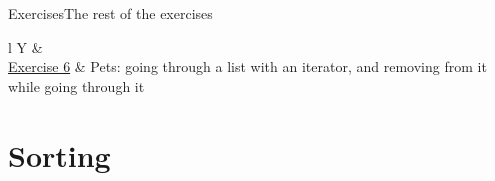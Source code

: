 \documentclass[\deckoptions]{beamer}
\begin{document}
\begin{frame}{Exercises}{The rest of the exercises}
  \begin{datatable}{l Y}
     &  \\
    \grouprule
    \href{https://github.com/alfaro96/programming-fundamentals-ii/tree/main/code/Collections/Exercise\%206}{Exercise 6} &
      Pets: going through a list with an iterator, and removing from it while going through it \\
    \grouprule
  \end{datatable}
\end{frame}

\section{Sorting}
\end{document}
